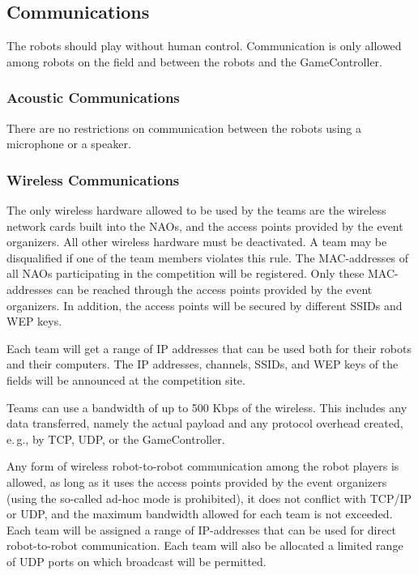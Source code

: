 \documentclass[12pt]{article}
\newcommand{\eg}{\mbox{e.\,g.}\xspace}
\begin{document}
\subsection{Communications}

The robots should play without human control. Communication is only allowed among robots on the field and between the robots and the GameController.

\subsubsection{Acoustic Communications}

There are no restrictions on communication between the robots using a microphone or a speaker.

\subsubsection{Wireless Communications}

The only wireless hardware allowed to be used by the teams are the wireless network cards built into the NAOs, and the access points provided by the event organizers. All other wireless hardware must be deactivated. A team may be disqualified if one of the team members violates this rule. The MAC-addresses of all NAOs participating in the competition will be registered. Only these MAC-addresses can be reached through the access points provided by the event organizers. In addition, the access points will be secured by different SSIDs and WEP keys. 

Each team will get a range of IP addresses that can be used both for their robots and their computers. The IP addresses, channels, SSIDs, and WEP keys of the fields will be announced at the competition site.

Teams can use a bandwidth of up to 500 Kbps of the wireless. This includes any data transferred, namely the actual payload and any protocol overhead created, \eg, by TCP, UDP, or the GameController.

Any form of wireless robot-to-robot communication among the robot players is allowed, as long as it uses the access points provided by the event organizers (using the so-called ad-hoc mode is prohibited), it does not conflict with TCP/IP or UDP, and the maximum bandwidth allowed for each team is not exceeded. Each team will be assigned a range of IP-addresses that can be used for direct robot-to-robot communication. Each team will also be allocated a limited range of UDP ports on which broadcast will be permitted.
\end{document}
